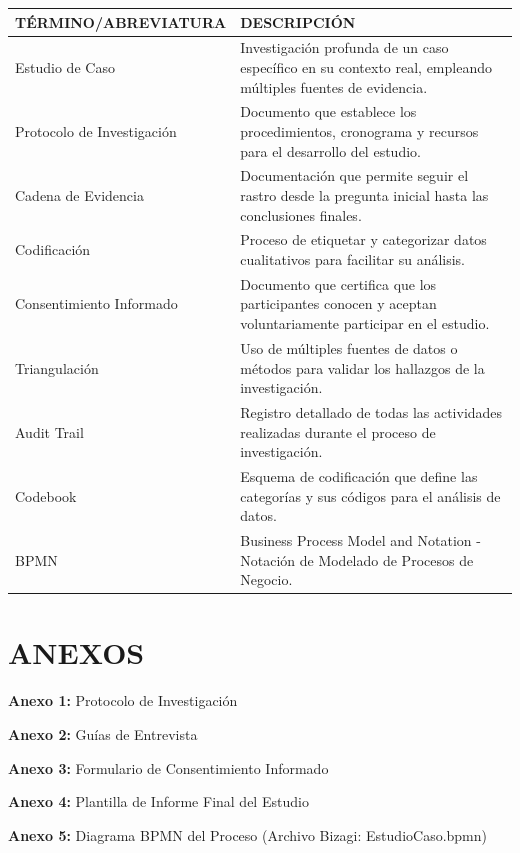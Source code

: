 \documentclass[12pt,a4paper]{article}
\begin{document}
\begin{longtable}{|L{4cm}|L{10cm}|}
\hline
\textbf{TÉRMINO/ABREVIATURA} & \textbf{DESCRIPCIÓN} \\
\hline
\endhead

Estudio de Caso & Investigación profunda de un caso específico en su contexto real, empleando múltiples fuentes de evidencia. \\
\hline

Protocolo de Investigación & Documento que establece los procedimientos, cronograma y recursos para el desarrollo del estudio. \\
\hline

Cadena de Evidencia & Documentación que permite seguir el rastro desde la pregunta inicial hasta las conclusiones finales. \\
\hline

Codificación & Proceso de etiquetar y categorizar datos cualitativos para facilitar su análisis. \\
\hline

Consentimiento Informado & Documento que certifica que los participantes conocen y aceptan voluntariamente participar en el estudio. \\
\hline

Triangulación & Uso de múltiples fuentes de datos o métodos para validar los hallazgos de la investigación. \\
\hline

Audit Trail & Registro detallado de todas las actividades realizadas durante el proceso de investigación. \\
\hline

Codebook & Esquema de codificación que define las categorías y sus códigos para el análisis de datos. \\
\hline

BPMN & Business Process Model and Notation - Notación de Modelado de Procesos de Negocio. \\
\hline

\end{longtable}

\section{ANEXOS}

\textbf{Anexo 1:} Protocolo de Investigación

\textbf{Anexo 2:} Guías de Entrevista

\textbf{Anexo 3:} Formulario de Consentimiento Informado

\textbf{Anexo 4:} Plantilla de Informe Final del Estudio

\textbf{Anexo 5:} Diagrama BPMN del Proceso (Archivo Bizagi: EstudioCaso.bpmn)
\end{document}
